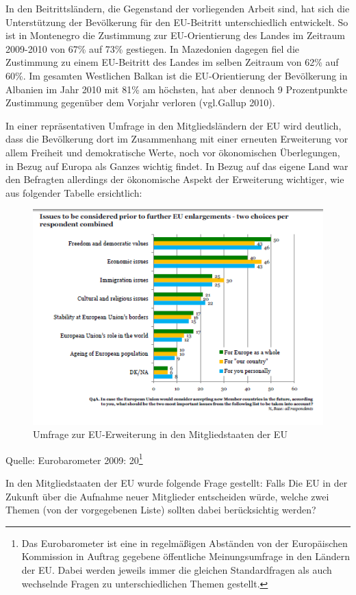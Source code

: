 In den Beitrittsländern, die Gegenstand der vorliegenden Arbeit sind, hat sich die Unterstützung der Bevölkerung für den EU-Beitritt unterschiedlich entwickelt. So ist in Montenegro die Zustimmung zur EU-Orientierung des Landes im Zeitraum 2009-2010 von 67\% auf 73\% gestiegen. In Mazedonien dagegen fiel die Zustimmung zu einem EU-Beitritt des Landes im selben Zeitraum von 62\% auf 60\%. Im gesamten Westlichen Balkan ist die EU-Orientierung der Bevölkerung in Albanien im Jahr 2010 mit 81\% am höchsten, hat aber dennoch 9 Prozentpunkte Zustimmung gegenüber dem Vorjahr verloren (vgl.Gallup 2010).\par
In einer repräsentativen Umfrage in den Mitgliedsländern der EU wird deutlich, dass die Bevölkerung dort im Zusammenhang mit einer erneuten Erweiterung vor allem Freiheit und demokratische Werte, noch vor ökonomischen Überlegungen, in Bezug auf Europa als Ganzes wichtig findet. In Bezug auf das eigene Land war den Befragten allerdings der ökonomische Aspekt der Erweiterung wichtiger, wie aus folgender Tabelle ersichtlich:
\begin{figure}[H]
  \caption{Umfrage zur EU-Erweiterung in den Mitgliedstaaten der EU }
  \centering
  \includegraphics[width=5in]{Material/Umfrage}
\end{figure}
 Quelle: Eurobarometer 2009: 20\footnote{Das Eurobarometer ist eine in regelmäßigen Abständen von der Europäischen Kommission in Auftrag gegebene öffentliche Meinungsumfrage in den Ländern der EU. Dabei werden jeweils immer die gleichen Standardfragen als auch wechselnde Fragen zu unterschiedlichen Themen gestellt.}

In den Mitgliedstaaten der EU wurde folgende Frage gestellt: Falls Die EU in der Zukunft über die Aufnahme neuer Mitglieder entscheiden würde, welche zwei Themen (von der vorgegebenen Liste) sollten dabei berücksichtig werden?

